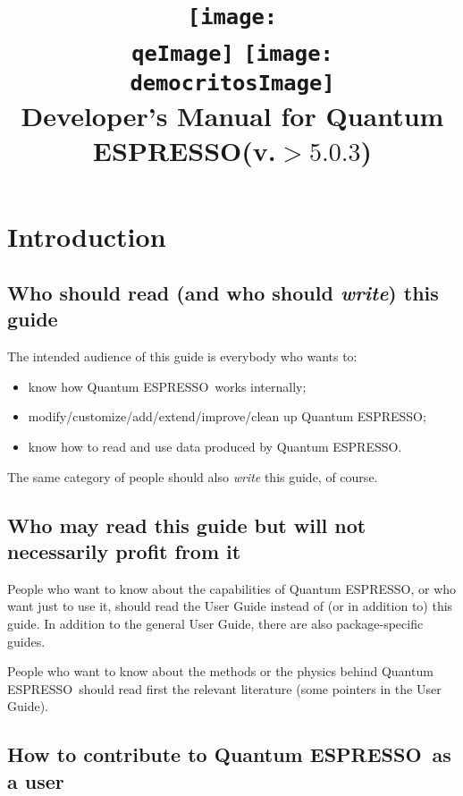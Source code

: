 \documentclass[12pt,a4paper]{article}
\def\version{$>5.0.3$}
\def\qe{{\sc Quantum ESPRESSO}}
\def\qeImage{quantum_espresso.pdf}
\def\democritosImage{democritos.pdf}
\def\qeImage{quantum_espresso.png}
\def\democritosImage{democritos.png}
\begin{document}
 
\author{}
\date{}
\title{
  \texttt{[image: \\qeImage]} \hskip 2cm
  \texttt{[image: \\democritosImage]}\\
  \vskip 1cm
  \Huge Developer's Manual for \qe (v.\version) \smallskip
}
\maketitle

\tableofcontents

\newpage

\section{Introduction}

\subsection{Who should read (and who should {\em write}) this guide}

The intended audience of this guide is everybody who wants to:
\begin{itemize}
\item know how \qe\ works internally;
\item modify/customize/add/extend/improve/clean up \qe;
\item know how to read and use data produced by \qe.
\end{itemize}
The same category of people should also {\em write} this guide, of course.

\subsection{Who may read this guide but will not necessarily profit from it}

People who want to know about the capabilities of \qe,
or who want just to use it, should read the User Guide
instead of (or in addition to) this guide. In addition
to the general User Guide, there are also package-specific
guides.

People who want to know about the methods or the physics
behind \qe\ should read first the relevant  
literature (some pointers in the User Guide).

\subsection{How to contribute to \qe\ as a user}
\end{document}
